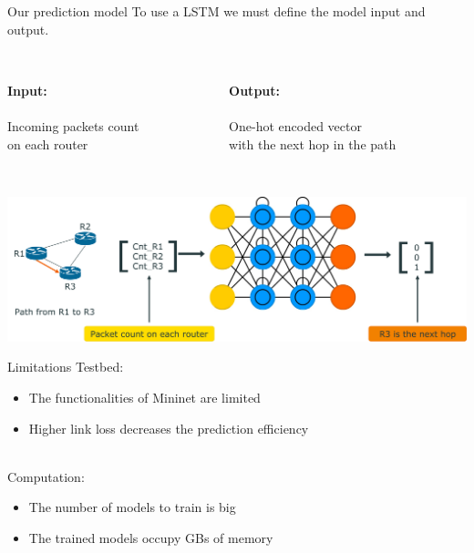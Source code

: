\documentclass{beamer}
\begin{document}
\begin{frame}{Our prediction model}	
	To use a LSTM we must define the model input and output.\\
	~\\
	\begin{columns}[totalwidth=\textwidth]
	\begin{column}{0.49\textwidth}
	\textbf{Input:}\\~\\
	Incoming packets count \\on each router\\~\\
	\end{column}
	\begin{column}{0.49\textwidth}  %
	\textbf{Output:}\\~\\
	One-hot encoded vector \\with the next hop in the path\\~\\
\end{column}
\end{columns}
	\centering
	\includegraphics[width=\textwidth]{img/prediction_flow}
\end{frame}
\begin{frame}{Limitations}
	Testbed:
	\begin{itemize}
	\item The functionalities of Mininet are limited
	\item Higher link loss decreases the prediction efficiency
	\end{itemize}
	~\\
	Computation:	
	\begin{itemize}
	\item The number of models to train is big
	\item The trained models occupy GBs of memory
	\end{itemize}
\end{frame}
\end{document}
